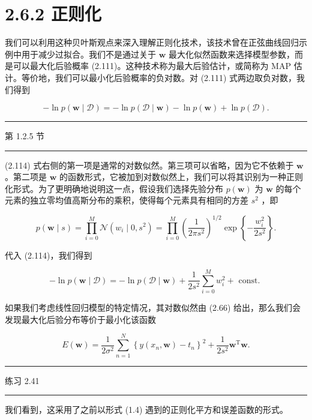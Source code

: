 \documentclass[10pt]{article}
\newcommand{\HRule}{\begin{center}\rule{0.9\linewidth}{0.2mm}\end{center}}
\begin{document}
\section*{2.6.2 正则化}

我们可以利用这种贝叶斯观点来深入理解正则化技术，该技术曾在正弦曲线回归示例中用于减少过拟合。我们不是通过关于 \(\mathbf{w}\) 最大化似然函数来选择模型参数，而是可以最大化后验概率 (2.111)。这种技术称为最大后验估计，或简称为 MAP 估计。等价地，我们可以最小化后验概率的负对数。对 (2.111) 式两边取负对数，我们得到

\[
- \ln p\left( {\mathbf{w} \mid  \mathcal{D}}\right)  =  - \ln p\left( {\mathcal{D} \mid  \mathbf{w}}\right)  - \ln p\left( \mathbf{w}\right)  + \ln p\left( \mathcal{D}\right) . \tag{2.114}
\]

\HRule

第 1.2.5 节

\HRule

(2.114) 式右侧的第一项是通常的对数似然。第三项可以省略，因为它不依赖于 \(\mathbf{w}\) 。第二项是 \(\mathbf{w}\) 的函数形式，它被加到对数似然上，我们可以将其识别为一种正则化形式。为了更明确地说明这一点，假设我们选择先验分布 \(p\left( \mathbf{w}\right)\) 为 \(\mathbf{w}\) 的每个元素的独立零均值高斯分布的乘积，使得每个元素具有相同的方差 \({s}^{2}\) ，即

\[
p\left( {\mathbf{w} \mid  s}\right)  = \mathop{\prod }\limits_{{i = 0}}^{M}\mathcal{N}\left( {{w}_{i} \mid  0,{s}^{2}}\right)  = \mathop{\prod }\limits_{{i = 0}}^{M}{\left( \frac{1}{{2\pi }{s}^{2}}\right) }^{1/2}\exp \left\{  {-\frac{{w}_{i}^{2}}{2{s}^{2}}}\right\}  . \tag{2.115}
\]

代入 (2.114)，我们得到

\[
- \ln p\left( {\mathbf{w} \mid  \mathcal{D}}\right)  =  - \ln p\left( {\mathcal{D} \mid  \mathbf{w}}\right)  + \frac{1}{2{s}^{2}}\mathop{\sum }\limits_{{i = 0}}^{M}{w}_{i}^{2} + \text{ const. } \tag{2.116}
\]

如果我们考虑线性回归模型的特定情况，其对数似然由 (2.66) 给出，那么我们会发现最大化后验分布等价于最小化该函数

\[
E\left( \mathbf{w}\right)  = \frac{1}{2{\sigma }^{2}}\mathop{\sum }\limits_{{n = 1}}^{N}{\left\{  y\left( {x}_{n},\mathbf{w}\right)  - {t}_{n}\right\}  }^{2} + \frac{1}{2{s}^{2}}{\mathbf{w}}^{\mathrm{T}}\mathbf{w}. \tag{2.117}
\]

\HRule

练习 2.41

\HRule

我们看到，这采用了之前以形式 (1.4) 遇到的正则化平方和误差函数的形式。
\end{document}
